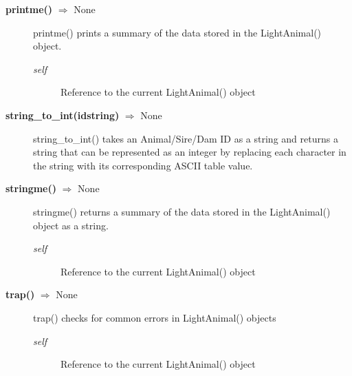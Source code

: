 \begin{description}
\item[\textbf{printme()} $\Rightarrow$ None]
printme() prints a summary of the data stored in the LightAnimal() object.
\begin{description}
\item[\emph{self}] Reference to the current LightAnimal() object
\end{description}

\item[\textbf{string\_to\_int(idstring)} $\Rightarrow$ None]
string\_to\_int() takes an Animal/Sire/Dam ID as a string and returns a string that can be represented as an integer by replacing each character in the string with its corresponding ASCII table value.

\item[\textbf{stringme()} $\Rightarrow$ None]
stringme() returns a summary of the data stored in the LightAnimal() object as a string.
\begin{description}
\item[\emph{self}] Reference to the current LightAnimal() object
\end{description}

\item[\textbf{trap()} $\Rightarrow$ None]
trap() checks for common errors in LightAnimal() objects
\begin{description}
\item[\emph{self}] Reference to the current LightAnimal() object
\end{description}

\end{description}

